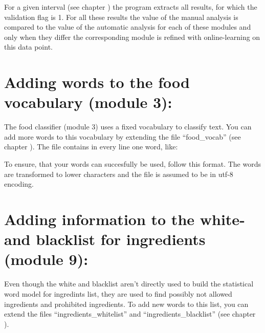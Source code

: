 \documentclass[letterpaper,10pt,english]{sphinxmanual}
\begin{document}
For a given interval (see chapter {\hyperref[\detokenize{configuration:configuration}]{}}) the program
extracts all results, for which the validation flag is 1. For all
these results the value of the manual analysis is compared to the
value of the automatic analysis for each of these modules and only
when they differ the corresponding module is refined with
online-learning on this data point.


\section{Adding words to the food vocabulary (module 3):}
\label{\detokenize{online_learning:food-vocab-label}}\label{\detokenize{online_learning:adding-words-to-the-food-vocabulary-module-3}}
The food classifier (module 3) uses a fixed vocabulary to classify
text. You can add more words to this vocabulary by extending the file
“food\_vocab” (see chapter {\hyperref[\detokenize{configuration:configuration}]{}}). The file contains in
every line one word, like:

%
\begin{sphinxVerbatim}[commandchars=\\\{\}]
\end{sphinxVerbatim}

To ensure, that your words can succesfully be used, follow this
format. The words are transformed to lower characters and the file is
assumed to be in utf-8 encoding.


\section{Adding information to the white- and blacklist for ingredients (module 9):}
\label{\detokenize{online_learning:black-white-online}}\label{\detokenize{online_learning:adding-information-to-the-white-and-blacklist-for-ingredients-module-9}}
Even though the white and blacklist aren’t directly used to build the
statistical word model for ingredints list, they are used to find
possibly not allowed ingredients and prohibited ingredients. To add
new words to this list, you can extend the files
“ingredients\_whitelist” and “ingredients\_blacklist” (see chapter
{\hyperref[\detokenize{configuration:configuration}]{}}).
\end{document}
